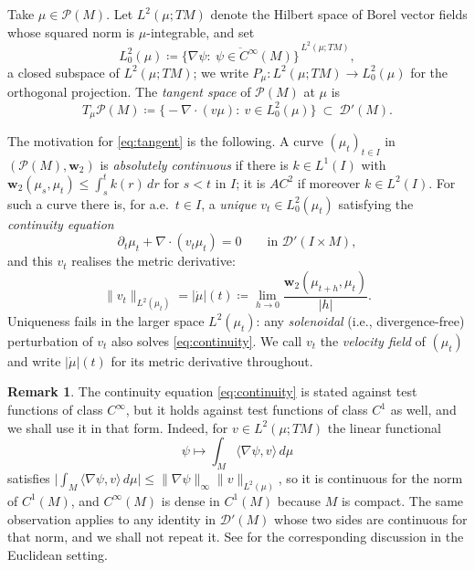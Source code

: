 \documentclass[11pt,reqno]{amsart}
\theoremstyle{plain}
\theoremstyle{definition}
\newtheorem{rmk}[thm]{Remark}
\newcommand{\dw}{\mathbf{w}_2}
\newcommand{\Prob}{\mathcal{P}}
\newcommand{\Dist}{\mathcal{D}'}
\begin{document}
Take \( \mu\in\Prob(M) \).
Let \( L^2(\mu;TM) \) denote the Hilbert space of Borel vector fields whose squared norm is \( \mu \)-integrable, and set
\begin{equation}\label{eq:L20}
    L^2_0(\mu)\coloneqq\overline{\{\nabla\psi:\ \psi\in C^\infty(M)\}}^{\,L^2(\mu;TM)} ,
\end{equation}
a closed subspace of \( L^2(\mu;TM) \); we write \( P_\mu:L^2(\mu;TM)\to L^2_0(\mu) \) for the orthogonal projection.
The \emph{tangent space} of \( \Prob(M) \) at \( \mu \) is
\begin{equation}\label{eq:tangent}
    T_\mu\Prob(M)\coloneqq\big\{-\nabla\!\cdot(v\mu):\ v\in L^2_0(\mu)\big\}\ \subset\ \Dist(M).
\end{equation}

The motivation for \eqref{eq:tangent} is the following.
A curve \( (\mu_t)_{t\in I} \) in \( (\Prob(M),\dw) \) is \emph{absolutely continuous} if there is \( k\in L^1(I) \) with \( \dw(\mu_s,\mu_t)\le\int_s^tk(r)\,dr \) for \( s<t \) in \( I \); it is \( AC^2 \) if moreover \( k\in L^2(I) \).
For such a curve there is, for a.e.\ \( t\in I \), a \emph{unique} \( v_t\in L^2_0(\mu_t) \) satisfying the \emph{continuity equation}
\begin{equation}\label{eq:continuity}
    \partial_t\mu_t+\nabla\!\cdot(v_t\mu_t)=0\qquad\text{in }\Dist(I\times M),
\end{equation}
and this \( v_t \) realises the metric derivative:
\begin{equation}\label{eq:metric.derivative}
    \lVert v_t\rVert_{L^2(\mu_t)}=\lvert\dot\mu\rvert(t)
    \coloneqq\lim_{h\to0}\frac{\dw(\mu_{t+h},\mu_t)}{\lvert h\rvert}.
\end{equation}
Uniqueness fails in the larger space \( L^2(\mu_t) \): any \emph{solenoidal} (i.e., divergence-free) perturbation of \( v_t \) also solves \eqref{eq:continuity}.
We call \( v_t \) the \emph{velocity field} of \( (\mu_t) \) and write \( \lvert\dot\mu\rvert(t) \) for its metric derivative throughout.
\begin{rmk}
\label{rmk:C1.test}
    The continuity equation \eqref{eq:continuity} is stated against test functions of class \( C^\infty \), but it holds against test functions of class \( C^1 \) as well, and we shall use it in that form.
    Indeed, for \( v\in L^2(\mu;TM) \) the linear functional
    \[
        \psi\longmapsto\int_M\langle\nabla\psi,v\rangle\,d\mu
    \]
    satisfies \( \lvert\int_M\langle\nabla\psi,v\rangle\,d\mu\rvert\le\lVert\nabla\psi\rVert_\infty\lVert v\rVert_{L^2(\mu)} \), so it is continuous for the norm of \( C^1(M) \), and \( C^\infty(M) \) is dense in \( C^1(M) \) because \( M \) is compact.
    The same observation applies to any identity in \( \Dist(M) \) whose two sides are continuous for that norm, and we shall not repeat it.
    See \cite[Chapter~8]{ambrosio_gradient_2008} for the corresponding discussion in the Euclidean setting.
\end{rmk}
\end{document}
